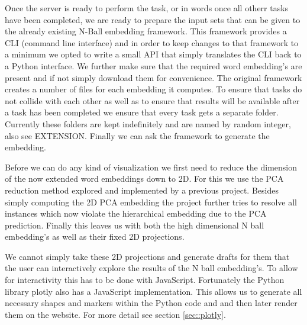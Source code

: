 \documentclass[]{article}
\begin{document}
Once the server is ready to perform the task, or in words once all otherr tasks have been completed, we are ready to prepare the input sets that can be given to the already existing N-Ball embedding framework. This framework provides a CLI (command line interface) and in order to keep changes to that framework to a minimum we opted to write a small API that simply translates the CLI back to a Python interface. We further make sure that the required word embedding's are present and if not simply download them for convenience. The original framework creates a number of files for each embedding it computes. To ensure that tasks do not collide with each other as well as to ensure that results will be available after a task has been completed we ensure that every task gets a separate folder. Currently these folders are kept indefinitely and are named by random integer, also see EXTENSION. Finally we can ask the framework to generate the embedding.

Before we can do any kind of visualization we first need to reduce the dimension of the now extended word embeddings down to 2D. For this we use the PCA reduction method explored and implemented by a previous project. Besides simply computing the 2D PCA embedding the project further tries to resolve all instances which now violate the hierarchical embedding due to the PCA prediction. Finally this leaves us with both the high dimensional N ball embedding's as well as their fixed 2D projections.

We cannot simply take these 2D projections and generate drafts for them that the user can interactively explore the results of the N ball embedding's. To allow for interactivity this has to be done with JavaScript. Fortunately the Python library plotly also has a JavaScript implementation. This allows us to generate all necessary shapes and markers within the Python code and and then later render them on the website. For more detail see section \ref{sec::plotly}.
\end{document}

